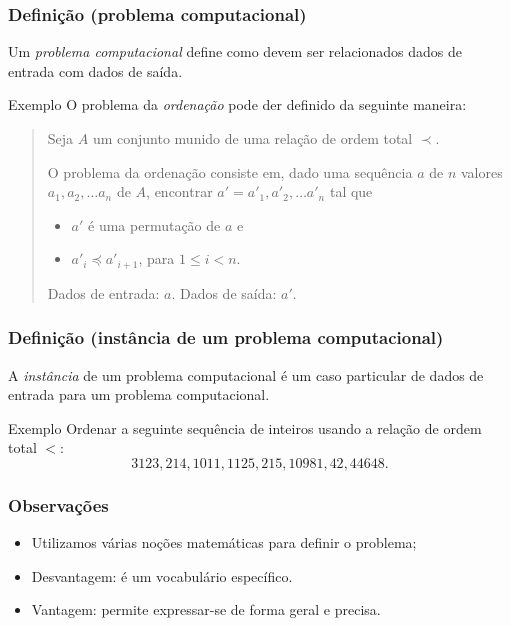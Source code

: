 \documentclass{beamer}
\begin{document}
\begin{frame}
  \frametitle{Definição (problema computacional)}

  Um \emph{problema computacional\/} define como devem ser relacionados dados de
  entrada com dados de saída.

  \begin{block}{Exemplo}
    O problema da \emph{ordenação} pode der definido da seguinte maneira:
    \begin{quote}
      Seja $A$ um conjunto munido de uma relação de ordem total $\prec$.

      O problema da ordenação consiste em, dado uma sequência $a$ de $n$ valores
      $a_1, a_2, \ldots a_n$ de $A$, encontrar $a' = a'_1, a'_2, \ldots a'_n$ tal
      que
      \begin{itemize}
      \item $a'$ é uma permutação de $a$ e
      \item $a'_i \preceq a'_{i+1}$, para $1 \le i < n$.
      \end{itemize}
      Dados de entrada: $a$. Dados de saída: $a'$.
    \end{quote}
    \end{block}
\end{frame}

\begin{frame}
  \frametitle{Definição (instância de um problema computacional)}

  A \emph{instância} de um problema computacional é um caso particular de dados
  de entrada para um problema computacional.

  \begin{block}{Exemplo}
    Ordenar a seguinte sequência de inteiros usando a relação de ordem total $<$:
    \[
    3123, 214, 1011, 1125, 215, 10981, 42, 44648.
    \]
    \end{block}
\end{frame}

\begin{frame}
  \frametitle{Observações}

  \begin{itemize}
    \item Utilizamos várias noções matemáticas para definir o problema;
    \item Desvantagem: é um vocabulário específico.
    \item Vantagem: permite expressar-se de forma geral e precisa.
    \end{itemize}
\end{frame}
\end{document}
